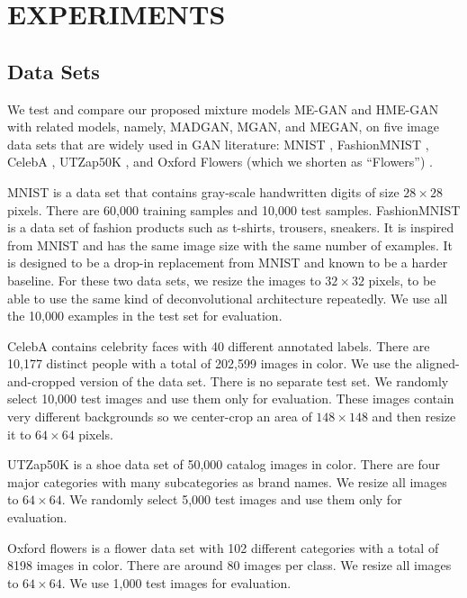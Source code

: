 \documentclass[a4paper,onesided,12pt]{report}
\begin{document}
\chapter{EXPERIMENTS}
\label{chapter:exps}

\section{Data Sets}
\label{sec:datasets}
We test and compare our proposed mixture models ME-GAN and HME-GAN with related models, namely, MADGAN, MGAN, and MEGAN, on five image data sets that are widely used in GAN literature: MNIST \cite{lecun1998gradient}, FashionMNIST \cite{xiao2017fashion}, CelebA \cite{liu2015deep},  UTZap50K \cite{yu2014fine}, and Oxford Flowers (which we shorten as ``Flowers'') \cite{nilsback2008automated}.

MNIST is a data set that contains gray-scale handwritten digits of size $28 \times 28$ pixels. There are 60,000 training samples and 10,000 test samples. FashionMNIST is a data set of fashion products such as t-shirts, trousers, sneakers. It is inspired from MNIST and has the same image size with the same number of examples. It is designed to be a drop-in replacement from MNIST and known to be a harder baseline. For these two data sets, we resize the images to $32 \times 32$ pixels, to be able to use the same kind of deconvolutional architecture repeatedly. We use all the 10,000 examples in the test set for evaluation.

CelebA contains celebrity faces with 40 different annotated labels. There are 10,177 distinct people with a total of 202,599 images in color. We use the aligned-and-cropped version of the data set. There is no separate test set. We randomly select 10,000 test images and use them only for evaluation. These images contain very different backgrounds so we center-crop an area of $148 \times 148$ and then resize it to $64 \times 64$ pixels.

UTZap50K is a shoe data set of 50,000 catalog images in color. There are four major categories with many subcategories as brand names. We resize all images to $64 \times 64$. We randomly select 5,000 test images and use them only for evaluation.

Oxford flowers is a flower data set with 102 different categories with a total of 8198 images in color. There are around 80 images per class. We resize all images to $64 \times 64$. We use 1,000 test images for evaluation.
\end{document}
